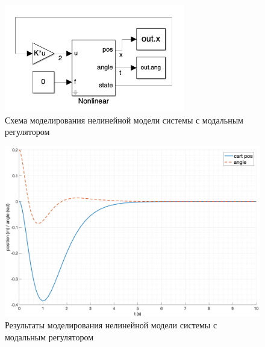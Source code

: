 \begin{figure}[ht!]
    \centering
    \includegraphics[width=0.7\textwidth]{media/modal_control_scheme.png}
    \caption{Схема моделирования нелинейной модели системы с модальным регулятором}
    \label{fig:modal_control_scheme_nonlinear}
\end{figure}
\begin{figure}[ht!]
    \centering
    \includegraphics[width=\textwidth]{media/plots/modal_control/modal_control_out.png}
    \caption{Результаты моделирования нелинейной модели системы с модальным регулятором}
    \label{fig:modal_control_nonlinear_out}
\end{figure}